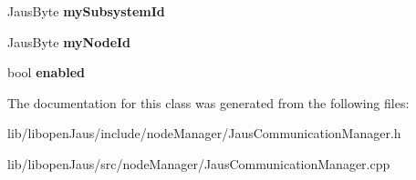 \begin{DoxyCompactItemize}
\item 
\hypertarget{class_jaus_communication_manager_ac1b5c732615e8eccb1abdad617cfd392}{\-Jaus\-Byte {\bfseries my\-Subsystem\-Id}}\label{class_jaus_communication_manager_ac1b5c732615e8eccb1abdad617cfd392}

\item 
\hypertarget{class_jaus_communication_manager_a4b2aa830948dbe354ebb312d1b437e81}{\-Jaus\-Byte {\bfseries my\-Node\-Id}}\label{class_jaus_communication_manager_a4b2aa830948dbe354ebb312d1b437e81}

\item 
\hypertarget{class_jaus_communication_manager_abeae0ede90718f01359c9b97e2918dbc}{bool {\bfseries enabled}}\label{class_jaus_communication_manager_abeae0ede90718f01359c9b97e2918dbc}

\end{DoxyCompactItemize}


\-The documentation for this class was generated from the following files\-:\begin{DoxyCompactItemize}
\item 
lib/libopen\-Jaus/include/node\-Manager/\-Jaus\-Communication\-Manager.\-h\item 
lib/libopen\-Jaus/src/node\-Manager/\-Jaus\-Communication\-Manager.\-cpp\end{DoxyCompactItemize}
